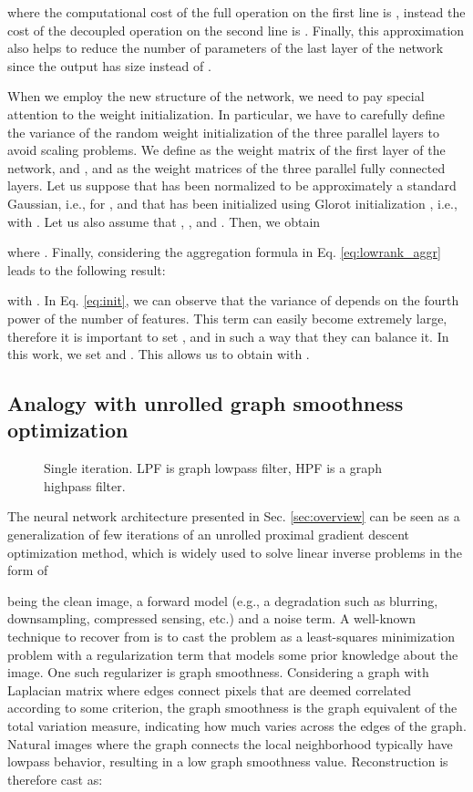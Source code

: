 \documentclass[journal]{IEEEtran}
\begin{document}
where the computational cost of the full operation on the first line is , instead the cost of the decoupled operation on the second line is .
Finally, this approximation also helps to reduce the number of parameters of the last layer of the  network since the output has size  instead of .

When we employ the new structure of the  network, we need to pay special attention to the weight initialization. In particular, we have to carefully define the variance of the random weight initialization of the three parallel layers to avoid scaling problems. We define  as the weight matrix of the first layer of the  network, and ,  and  as the weight matrices of the three parallel fully connected layers. Let us suppose that  has been normalized to be approximately a standard Gaussian, i.e.,  for , and that  has been initialized using Glorot initialization \cite{pmlr-v9-glorot10a}, i.e.,  with . Let us also assume that , , and . Then, we obtain

where . Finally, considering the aggregation formula in Eq. \eqref{eq:lowrank_aggr} leads to the following result:

with . In Eq. \eqref{eq:init}, we can observe that the variance of  depends on the fourth power of the number of features. This term can easily become extremely large, therefore it is important to set ,  and  in such a way that they can balance it. In this work, we set  and . This allows us to obtain  with .
\subsection{Analogy with unrolled graph smoothness optimization} \label{sec:analogy}

\begin{figure}
    \centering
    \caption{Single iteration. LPF is graph lowpass filter, HPF is a graph highpass filter.}
    \label{fig:update_fig}
\end{figure}

The neural network architecture presented in Sec. \ref{sec:overview} can be seen as a generalization of few iterations of an unrolled proximal gradient descent optimization method, which is widely used to solve linear inverse problems in the form of

being  the clean image,  a forward model (e.g., a degradation such as blurring, downsampling, compressed sensing, etc.) and  a noise term. A well-known technique to recover  from  is to cast the problem as a least-squares minimization problem with a regularization term that models some prior knowledge about the image. One such regularizer is graph smoothness. Considering a graph with Laplacian matrix  where edges connect pixels that are deemed correlated according to some criterion, the graph smoothness  is the graph equivalent of the total variation measure, indicating how much  varies across the edges of the graph. Natural images where the graph connects the local neighborhood typically have lowpass behavior, resulting in a low graph smoothness value. Reconstruction is therefore cast as:
\end{document}
